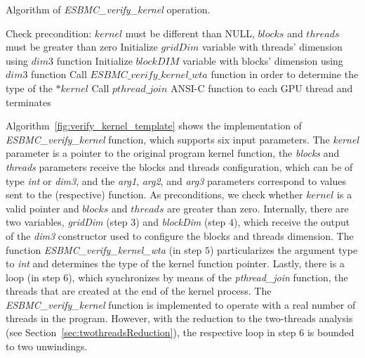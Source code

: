 \documentclass[times, doublespace]{cpeauth}
\begin{document}
\begin{algorithm}
\caption{Algorithm of \textit{ESBMC\_verify\_kernel} operation.}
\label{fig:verify_kernel_template}
\begin{algorithmic}[1]
	\State Check precondition: $kernel$ must be different than NULL, $blocks$ and $threads$ must be greater than zero
  \State Initialize $gridDim$ variable with threads' dimension using $dim3$ function
  \State Initialize $blockDIM$ variable with blocks' dimension using $dim3$ function
  \State Call $ESBMC\_verify\_kernel\_wta$ function in order to determine the type of the $*kernel$
  \State Call $pthread\_join$ ANSI-C function to each GPU thread and terminates
  \EndProcedure
\end{algorithmic}
\end{algorithm}
 
Algorithm~\ref{fig:verify_kernel_template} shows the implementation of \textit{ESBMC\_verify\_kernel} function, which supports six input parameters. The \textit{kernel} parameter is a pointer to the original program kernel function, the \textit{blocks} and \textit{threads} parameters receive the blocks and threads configuration, which can be of type \textit{int} or \textit{dim3}, and the \textit{arg1}, \textit{arg2}, and \textit{arg3} parameters correspond to values sent to the (respective) function. As preconditions, we check whether $kernel$ is a valid pointer and $blocks$ and $threads$ are greater than zero. Internally, there are two variables, \textit{gridDim} (step $3$) and \textit{blockDim} (step $4$), which receive the output of the \textit{dim3} constructor used to configure the blocks and threads dimension. The function \textit{ESBMC\_verify\_kernel\_wta} (in step $5$) particularizes the argument type to \textit{int} and determines the type of the kernel function pointer. Lastly, there is a loop (in step $6$), which synchronizes by means of the \textit{pthread\_join} function, the threads that are created at the end of the kernel process. The \textit{ESBMC\_verify\_kernel} function is implemented to operate with a real number of threads in the program. However, with the reduction to the two-threads analysis (see Section~\ref{sec:twothreadsReduction}), the respective loop in step $6$ is bounded to two unwindings.
\end{document}
